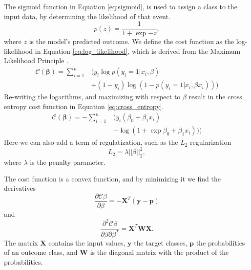 The sigmoid function in Equation \eqref{eq:sigmoid}, is used to assign a class to the input data, by determining the likelihood of that event.
\begin{equation}\label{eq:sigmoid}
    p(z) = \frac{1}{1 + \exp{-z}} , 
\end{equation}
where $z$ is the model's predicted outcome. We define the cost function as the log-likelihood in Equation \eqref{eq:log_likelihood}, which is derived from the Maximum Likelihood Principle \cite[p. 31]{hastie:2009:elements}.
\begin{equation}\label{eq:log_likelihood}
\begin{split}
    \mathcal{C}(\mathbf{\beta}) = \sum_{i=1}^{n} & (y_{i} \log p(y_{i} = 1 | x_{i}, \beta) \\
    & + (1 - y_{i}) \log (1 - p(y_{i} = 1 | x_{i}, \beta x_{i})))
\end{split}
\end{equation}
Re-writing the logarithms, and maximizing with respect to $\beta$ result in the cross entropy cost function in Equation \eqref{eq:cross_entropy}.
\begin{equation}\label{eq:cross_entropy}
\begin{split}
    \mathcal{C}(\mathbf{\beta}) = - \sum_{i=1}^{n} & (y_{i} (\beta_{0} + \beta_{1} x_{i}) \\
    &- \log (1 + \exp{\beta_{0} + \beta_{1} x_{i}})))
\end{split}
\end{equation}
Here we can also add a term of regulatization, such as the $L_{2}$ regularization 
\begin{equation}
    L_{2} = \lambda || \beta ||_{2}^{2} ,
\end{equation}
where $\lambda$ is the penalty parameter.

The cost function is a convex function, and by minimizing it we find the derivatives
\begin{equation}\label{eq:d_cross_entropy}
    \frac{\partial \mathcal{C} \beta}{\partial \beta} = - \mathbf{X}^{T} (\mathbf{y} - \mathbf{p})
\end{equation}
and 
\begin{equation}\label{eq:dd_cross_entropy}
    \frac{\partial^{2} \mathcal{C} \beta}{\partial \beta \partial \beta^{T}} = \mathbf{X}^{T} \mathbf{W} \mathbf{X} .
\end{equation}
The matrix $\mathbf{X}$ contains the input values, $\mathbf{y}$ the target classes, $\mathbf{p}$ the probabilities of an outcome class, and $\mathbf{W}$ is the diagonal matrix with the product of the probabilities. 

